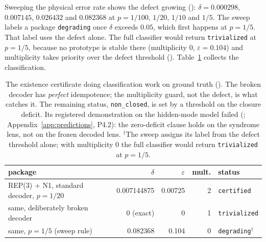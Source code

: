 Sweeping the physical error rate shows the defect growing (\gExact): $\delta = 0.000298$, $0.007145$, $0.026432$ and $0.082368$ at $p = 1/100$, $1/20$, $1/10$ and $1/5$. The sweep labels a package \texttt{degrading} once $\delta$ exceeds $0.05$, which first happens at $p = 1/5$. %
That label uses the defect alone. The full classifier would return \texttt{trivialized} at $p = 1/5$, because no prototype is stable there (multiplicity $0$, $\varepsilon = 0.104$) and multiplicity takes priority over the defect threshold (\gExact). %
Table~\ref{tab:certificate} collects the classification.

\begin{table}[htbp]
\centering\footnotesize\setlength{\tabcolsep}{4pt}
\begin{tabular}{l r r r l}
\toprule
package & $\delta$ & $\varepsilon$ & mult. & status \\
\midrule
REP(3) + N1, standard decoder, $p = 1/20$ & 0.007144875 & 0.00725 & 2 & \texttt{certified} \\ %
same, deliberately broken decoder & 0 (exact) & 0 & 1 & \texttt{trivialized} \\ %
same, $p = 1/5$ (sweep rule) & 0.082368 & 0.104 & 0 & \texttt{degrading}$^{\dagger}$ \\ %
\bottomrule
\end{tabular}
\caption{The existence certificate doing classification work on ground truth (\gExact). The broken decoder has \emph{perfect} idempotence; the multiplicity guard, not the defect, is what catches it. The remaining status, \texttt{non\_closed}, is set by a threshold on the closure deficit. Its registered demonstration on the hidden-mode model failed (\gRegNeg; Appendix~\ref{app:predictions}, P4.2): the zero-deficit clause holds on the syndrome lens, not on the frozen decoded lens. $^{\dagger}$The sweep assigns its label from the defect threshold alone; with multiplicity $0$ the full classifier would return \texttt{trivialized} at $p = 1/5$.} %
\label{tab:certificate}
\end{table}

